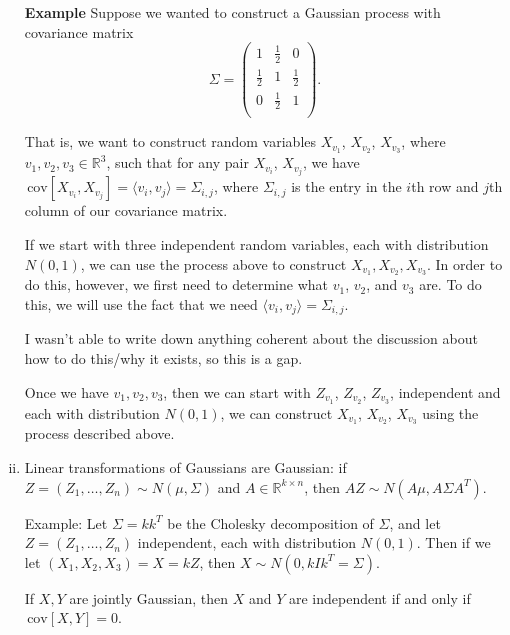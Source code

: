 \documentclass{article}
\theoremstyle{definition}
\newcommand{\R}{\mathbb{R}}
\newcommand{\cov}{\,\mathrm{cov}}
\begin{document}
\begin{enumerate}[(i)]
\textbf{Example} Suppose we wanted to construct a Gaussian process with covariance matrix \[\Sigma=\left(\begin{array}{ccc}
1 & \frac{1}{2} & 0\\
\frac{1}{2} & 1 & \frac{1}{2}\\
0 & \frac{1}{2} & 1\\
\end{array}\right).\]

That is, we want to construct random variables $X_{v_1}$, $X_{v_2}$, $X_{v_3}$, where $v_1,v_2,v_3\in\R^3$, such that for any pair $X_{v_i}$, $X_{v_j}$, we have $\cov[X_{v_i},X_{v_j}]=\langle v_i,v_j\rangle=\Sigma_{i,j}$, where $\Sigma_{i,j}$ is the entry in the $i$th row and $j$th column of our covariance matrix.

If we start with three independent random variables, each with distribution $N(0,1)$, we can use the process above to construct $X_{v_1},X_{v_2},X_{v_3}$.  In order to do this, however, we first need to determine what $v_1$, $v_2$, and $v_3$ are.  To do this, we will use the fact that we need $\langle v_i,v_j\rangle=\Sigma_{i,j}$.

I wasn't able to write down anything coherent about the discussion about how to do this/why it exists, so this is a gap.

Once we have $v_1,v_2,v_3$, then we can start with $Z_{v_1}$, $Z_{v_2}$, $Z_{v_3}$, independent and each with distribution $N(0,1)$, we can construct $X_{v_1}$, $X_{v_2}$, $X_{v_3}$ using the process described above.

\item Linear transformations of Gaussians are Gaussian: if $Z=(Z_1,\dots,Z_n)\sim N(\mu,\Sigma)$ and $A\in\R^{k\times n}$, then $AZ\sim N(A\mu, A\Sigma A^T)$.

Example: Let $\Sigma= kk^T$ be the Cholesky decomposition of $\Sigma$, and let $Z=(Z_1,\dots,Z_n)$ independent, each with distribution $N(0,1)$.  Then if we let $(X_1,X_2,X_3)=X=kZ$, then $X\sim N(0,kIk^T=\Sigma)$.

If $X,Y$ are jointly Gaussian, then $X$ and $Y$ are independent if and only if $\cov[X,Y]=0$.

\end{enumerate}
\end{document}
